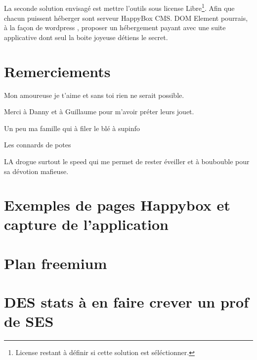 \documentclass[11pt, a4paper ]{article}
\let\stdsection\section
\renewcommand\section{\newpage\stdsection}
\begin{document}
\begin{spacing}{1.5}
\subparagraph{} 
La seconde solution envisagé est mettre l'outils sous license Libre\footnote{License restant à définir si cette solution est séléctionner.}. Afin que chacun puissent héberger sont serveur HappyBox CMS. DOM Element pourrais, à la façon de wordpress , proposer un hébergement payant avec une suite applicative dont seul la boite joyeuse détiens le secret.


\section{Remerciements}

		Mon amoureuse je t'aime et sans toi rien ne serait possible.

		Merci à Danny et à Guillaume pour m'avoir préter leurs jouet.

		Un peu ma famille qui à filer le blé à supinfo

		Les connards de potes

		LA drogue surtout le speed qui me permet de rester éveiller et à boubouble pour sa dévotion mafieuse.


	\appendix
	\section{Exemples de pages Happybox et capture de l'application}

	\section{Plan freemium}

	\section{DES stats à en faire crever un prof de SES}

	\printindex

	
	
\end{spacing}
\end{document}
